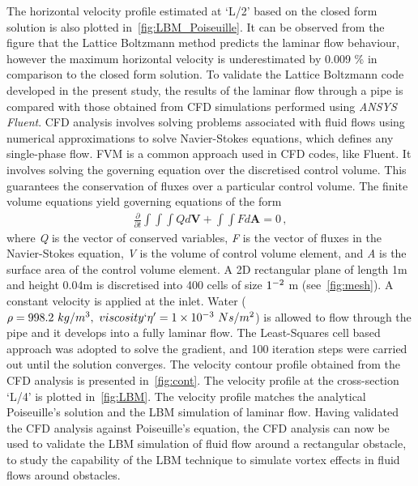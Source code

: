 The horizontal velocity profile estimated at `L/2' based on the 
closed form solution is also plotted 
in~\cref{fig:LBM_Poiseuille}. It can be observed from 
the figure that the Lattice Boltzmann method predicts the 
laminar flow behaviour, however the maximum horizontal velocity 
is underestimated by 0.009 \% in comparison to the closed form 
solution. To validate the Lattice Boltzmann code developed in 
the present study, the results of the laminar flow through a 
pipe is compared with those obtained from CFD simulations 
performed using \textit{ANSYS Fluent}. CFD analysis 
involves solving problems associated with fluid flows using 
numerical approximations to solve Navier-Stokes equations, 
which defines any single-phase flow. FVM is a common approach 
used in CFD codes, like Fluent. It involves solving the 
governing equation over the discretised control volume. This 
guarantees the conservation of fluxes over a particular control 
volume. The finite volume equations yield governing equations 
of the form
%
\begin{align}
\frac{\partial}{\partial t} \int\int\int  Q d\mathbf{V} + 
\int\int \mathit{F} d\mathbf{A} = 0\,,
\end{align}
%
where \textit{Q} is the vector of conserved variables, 
\textit{F} is the vector of fluxes in the Navier-Stokes 
equation, \textit{V} is the volume of control volume element, 
and \textit{A} is the surface area of the control volume 
element. A 2D rectangular plane of length 1m and height 0.04m 
is discretised into 400 cells of size $1 \time 10^{-2} $ m 
(see~\cref{fig:mesh}). A constant velocity is applied at the 
inlet. Water ($\rho = 998.2\mbox{ }kg/m^{3},\mbox{ } 
viscosity`\eta'=1 \times 10^{-3}\mbox{ } Ns/m^{2} $) is allowed to flow through 
the pipe and it develops into a fully laminar flow. The Least-Squares cell 
based approach was adopted to solve the gradient, and 100 iteration steps were 
carried out until the solution converges. The velocity contour profile obtained 
from the CFD analysis is presented in~\cref{fig:cont}. The velocity profile at 
the cross-section `L/4' is plotted in~\cref{fig:LBM}. The velocity profile 
matches the analytical Poiseuille's solution and the LBM simulation of laminar 
flow. Having validated the CFD analysis against Poiseuille's equation, the CFD 
analysis can now be used to validate the LBM simulation of fluid flow around a 
rectangular obstacle, to study the capability of the LBM technique to simulate 
vortex effects in fluid flows around obstacles.

